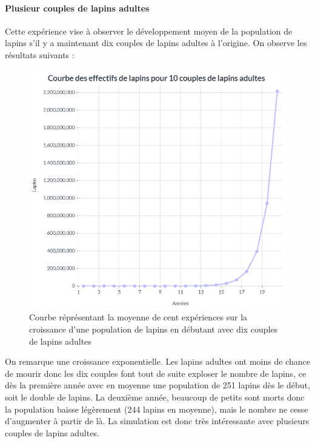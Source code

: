 \documentclass[12pt]{article}
\begin{document}
    \paragraph{Plusieur couples de lapins adultes}\hspace{0.5cm}
    \newline
    \par Cette expérience vise à observer le développement moyen de la population de lapins s'il y a maintenant dix couples de lapins adultes à l'origine. On observe les résultats suivants :
    \begin{figure}[!h]
	    \centering
	    
        \includegraphics[scale = 0.6]{Photos/courbes10lap.png}
        \caption{Courbe réprésentant la moyenne de cent expériences sur la croissance d'une population de lapins en débutant avec dix couples de lapins adultes}
	    \label{fig9}
	\end{figure}
    \par
    On remarque une croissance exponentielle. Les lapins adultes ont moins de chance de mourir donc les dix couples font tout de suite exploser le nombre de lapins, ce dès la première année avec en moyenne une population de 251 lapins dès le début, soit le double de lapins. La deuxième année, beaucoup de petits sont morts donc la population baisse légèrement (244 lapins en moyenne), mais le nombre ne cesse d'augmenter à partir de là. La simulation est donc très intéressante avec plusieurs couples de lapins adultes.
    \par
\end{document}
